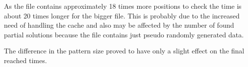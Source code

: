 As the file contains approximately 18 times more positions to check the time is about 20 times longer for the bigger file. This is probably due to the increased need of handling the cache and also may be affected by the number of found partial solutions because the file contains just pseudo randomly generated data.

The difference in the pattern size proved to have only a slight effect on the final reached times.

\begin{figure}
\begin{minipage}{.5\linewidth}
\centering
{}
\end{minipage}%
\begin{minipage}{.5\linewidth}
\centering
{}
\end{minipage}\par\medskip


\end{figure}
